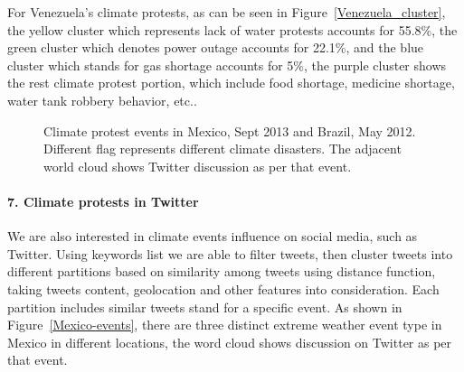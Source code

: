 \documentclass[9pt,twocolumn,twoside]{pnas-new}
\begin{document}
For Venezuela's climate protests, as can be seen in Figure~\ref{Venezuela_cluster}, the yellow cluster which represents lack of water protests accounts for 55.8\%, the green cluster which denotes power outage accounts for 22.1\%, and the blue cluster which stands for gas shortage accounts for 5\%, the purple cluster shows the rest climate protest portion, which include food shortage, medicine shortage, water tank robbery behavior, etc..



\begin{figure}[t]
	\centering
	\caption{Climate protest events in Mexico, Sept 2013 and Brazil, May 2012. Different flag represents different climate disasters. The adjacent world cloud shows Twitter discussion as per that event. }
\label{Twitter-events}
\end{figure}

\paragraph{7. Climate protests in Twitter}
We are also interested in climate events influence on social media, such as Twitter. Using keywords list we are able to filter tweets, then cluster tweets into different partitions based on similarity among tweets using distance function, taking tweets content, geolocation and other features into consideration. Each partition includes similar tweets stand for a specific event. As shown in Figure~\ref{Mexico-events}, there are three distinct extreme weather event type in Mexico in different locations, the word cloud shows discussion on Twitter as per that event.
\end{document}
